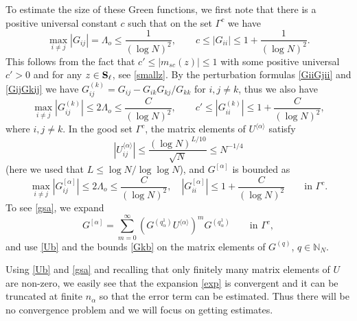 \documentclass[draft]{article}
\newcommand{\sa}{{[\alpha ]}}
\newcommand{\al}{\alpha}
\newcommand{\be}{\begin{equation}}
\newcommand{\ee}{\end{equation}}
\newcommand{\N}{{\mathbb N}}
\newcommand{\bS}{ {\bf  S}}
\numberwithin{equation}{section}
\numberwithin{theorem}{section}
\numberwithin{definition}{section}
\numberwithin{remark}{section}
\begin{document}
To estimate the size of these Green functions, we first note
that there is a positive universal constant $c$ such that
  on the set $\Gamma^c$ we have
\be
  \max_{i\ne j} | G_{ij}| = \Lambda_o\le \frac{1}{(\log N)^2}, \qquad 
  c\le  |G_{ii}| \le 1 + \frac{1}{(\log N)^2}.
\label{Gb}
\ee
This follows from the fact that  $c'\le |m_{sc}(z)|\le 1$ 
with some positive universal $c'>0$ and
 for any $z\in \bS_\ell$, see \eqref{smallz}.
By the perturbation formulas \eqref{GiiGjii} and \eqref{GijGkij} 
we have $G_{ij}^{(k)} = G_{ij}  - G_{ik}G_{kj}/ G_{kk}$ for $i,j \ne k$, thus we
also have 
\be
   \max_{i\ne j}| G_{ij}^{(k)}|\le 2\Lambda_o\le \frac{C}{(\log N)^2}, \qquad 
  c' \le  |G_{ii}^{(k)}| \le 1 + \frac{C}{(\log N)^2},
\label{Gkb}
\ee
where $i,j \ne k$. 
In the good set $\Gamma^c$,  the matrix 
elements of  $ U^{\langle \alpha \rangle }$  satisfy
\be
    | U^{\langle \alpha \rangle }_{ij}|\le \frac{(\log N)^{L/10}}{\sqrt{N}} \le N^{-1/4}
\label{Ub}
\ee
(here we used that $L\le  \log N/\log\log N$),
and $G^\sa$ is bounded as
\be
    \max_{i\ne j} |G^\sa_{ij}|\le 2\Lambda_o\le \frac{C}{(\log N)^2},
 \quad   |G_{ii}^\sa| \le 1 + \frac{C}{(\log N)^2} \qquad \mbox{in $\Gamma^c$}.
\label{gsa}
\ee
   To see \eqref{gsa}, we expand
$$
   G^\sa = \sum_{m=0}^\infty (G^{(q_\al^1)}  U^{\langle \alpha \rangle } )^{m}G^{(q_\al^1) }
  \qquad \mbox{in $\Gamma^c$},
$$
and use \eqref{Ub} and  the bounds \eqref{Gkb} on
 the matrix elements of $G^{(q)}$, $q\in \N_N$.

Using \eqref{Ub} and \eqref{gsa} and recalling that only 
finitely many matrix elements of $U$ are non-zero, we easily see that
the expansion \eqref{exp} is convergent and it can be truncated
 at finite $n_\alpha$ so
 that the error term can be estimated. Thus  there will be no convergence problem
and  we will focus on getting  estimates. 
\end{document}
